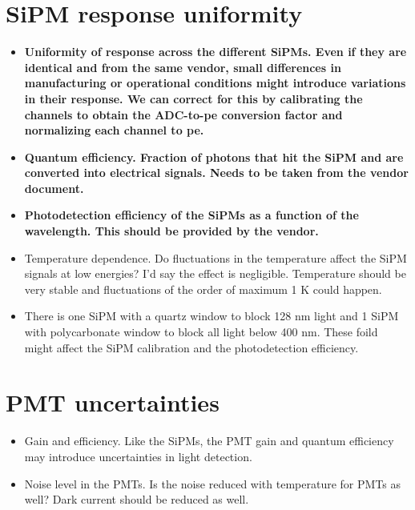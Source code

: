 \documentclass[11pt,a4paper,english,oneside, pdf]{article}
\begin{document}
	
	\section{SiPM response uniformity}
	
	\begin{itemize}
		\item \textbf{Uniformity of response across the different SiPMs. Even if they are identical and from the same vendor, small differences in manufacturing or operational conditions might introduce variations in their response. We can correct for this by calibrating the channels to obtain the ADC-to-pe conversion factor and normalizing each channel to pe.}
		
		\item \textbf{Quantum efficiency. Fraction of photons that hit the SiPM and are converted into electrical signals. Needs to be taken from the vendor document.}
		
		\item \textbf{Photodetection efficiency of the SiPMs as a function of the wavelength. This should be provided by the vendor.}
		
		\item Temperature dependence. Do fluctuations in the temperature affect the SiPM signals at low energies? I'd say the effect is negligible. Temperature should be very stable and fluctuations of the order of maximum 1 K could happen.
		
		\item There is one SiPM with a quartz window to block 128 nm light and 1 SiPM with polycarbonate window to block all light below 400 nm. These foild might affect the SiPM calibration and the photodetection efficiency.
	\end{itemize}
	
	
	\section{PMT uncertainties}
	
	\begin{itemize}
		\item Gain and efficiency. Like the SiPMs, the PMT gain and quantum efficiency may introduce uncertainties in light detection.
		
		\item Noise level in the PMTs. Is the noise reduced with temperature for PMTs as well? Dark current should be reduced as well.
	\end{itemize}
	
\end{document}

